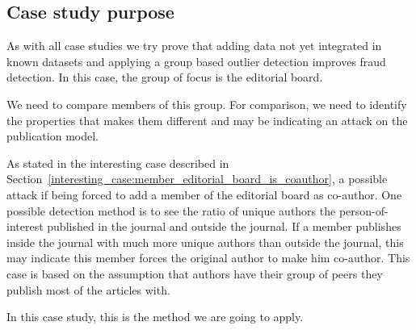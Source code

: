 \documentclass{ou-report}
\begin{document}
\subsection{Case study purpose}
\label{subsec:case2_purpose}
As with all case studies we try prove that adding data not yet integrated in
known datasets and applying a group based outlier 
detection improves fraud detection. In this case, the group
of focus is the editorial board.

We need to compare members of this group. For comparison, we need to identify
the properties that makes them different and may be indicating an attack on the
publication model.

As stated in the interesting case described in 
Section~\ref{interesting_case:member_editorial_board_is_coauthor}, a 
possible attack if being forced 
to add a member of the editorial board as co-author. One possible detection 
method is to see the ratio of unique authors the person-of-interest published
in the journal and outside the journal. If a member publishes inside the journal
with much more unique authors than outside the journal, this may indicate this 
member forces the original author to make him co-author. This case is based
on the assumption that authors have their group of peers they publish most
of the articles with.

In this case study, this is the method we are going to apply.

\end{document}
